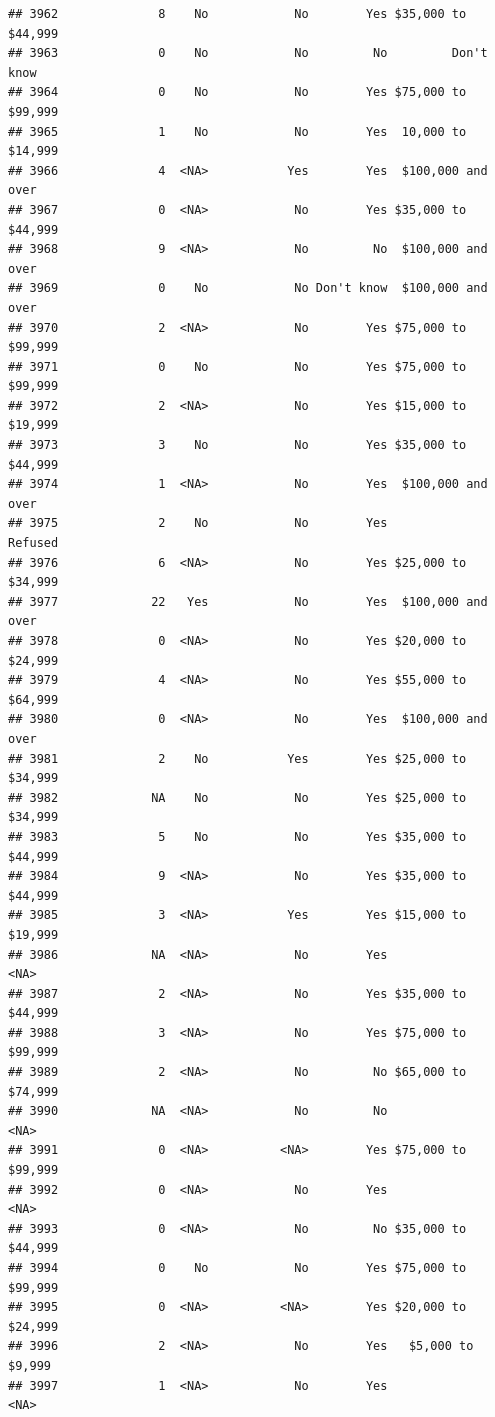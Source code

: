 \documentclass[man]{apa6}
\begin{document}
\begin{verbatim}
## 3962              8    No            No        Yes $35,000 to $44,999
## 3963              0    No            No         No         Don't know
## 3964              0    No            No        Yes $75,000 to $99,999
## 3965              1    No            No        Yes  10,000 to $14,999
## 3966              4  <NA>           Yes        Yes  $100,000 and over
## 3967              0  <NA>            No        Yes $35,000 to $44,999
## 3968              9  <NA>            No         No  $100,000 and over
## 3969              0    No            No Don't know  $100,000 and over
## 3970              2  <NA>            No        Yes $75,000 to $99,999
## 3971              0    No            No        Yes $75,000 to $99,999
## 3972              2  <NA>            No        Yes $15,000 to $19,999
## 3973              3    No            No        Yes $35,000 to $44,999
## 3974              1  <NA>            No        Yes  $100,000 and over
## 3975              2    No            No        Yes            Refused
## 3976              6  <NA>            No        Yes $25,000 to $34,999
## 3977             22   Yes            No        Yes  $100,000 and over
## 3978              0  <NA>            No        Yes $20,000 to $24,999
## 3979              4  <NA>            No        Yes $55,000 to $64,999
## 3980              0  <NA>            No        Yes  $100,000 and over
## 3981              2    No           Yes        Yes $25,000 to $34,999
## 3982             NA    No            No        Yes $25,000 to $34,999
## 3983              5    No            No        Yes $35,000 to $44,999
## 3984              9  <NA>            No        Yes $35,000 to $44,999
## 3985              3  <NA>           Yes        Yes $15,000 to $19,999
## 3986             NA  <NA>            No        Yes               <NA>
## 3987              2  <NA>            No        Yes $35,000 to $44,999
## 3988              3  <NA>            No        Yes $75,000 to $99,999
## 3989              2  <NA>            No         No $65,000 to $74,999
## 3990             NA  <NA>            No         No               <NA>
## 3991              0  <NA>          <NA>        Yes $75,000 to $99,999
## 3992              0  <NA>            No        Yes               <NA>
## 3993              0  <NA>            No         No $35,000 to $44,999
## 3994              0    No            No        Yes $75,000 to $99,999
## 3995              0  <NA>          <NA>        Yes $20,000 to $24,999
## 3996              2  <NA>            No        Yes   $5,000 to $9,999
## 3997              1  <NA>            No        Yes               <NA>

\end{verbatim}
\end{document}

